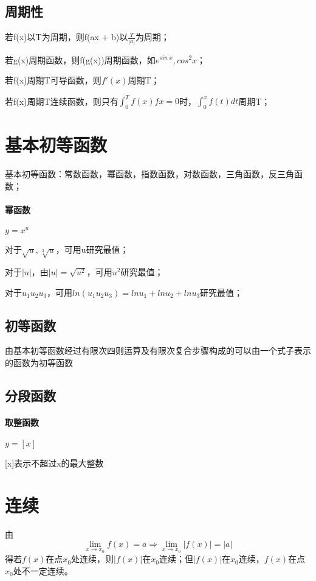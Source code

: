 \subsection{周期性}
若f(x)以T为周期，则f(ax + b)以\(\frac{T}{|a|}\)为周期；

若g(x)周期函数，则f(g(x))周期函数，如\(e^{sin\ x}, cos^2x\)；

若f(x)周期T可导函数，则\(f'(x)\)周期T；

若f(x)周期T连续函数，则只有\(\displaystyle \int_0^Tf(x)fx = 0\)时，\(\displaystyle \int_0^xf(t)dt\)周期T；


\section{基本初等函数}
基本初等函数：常数函数，幂函数，指数函数，对数函数，三角函数，反三角函数；
\paragraph{幂函数}
\(y = x^u\)

对于\(\sqrt{u},\sqrt[3]{u}\)，可用u研究最值；

对于\(|u|\)，由\(|u| = \sqrt{u^2}\)，可用\(u^2\)研究最值；

对于\(u_1u_2u_3\)，可用\(ln(u_1u_2u_3) = lnu_1 + lnu_2 + lnu_3\)研究最值；


\subsection{初等函数}
由基本初等函数经过有限次四则运算及有限次复合步骤构成的可以由一个式子表示的函数为初等函数


\subsection{分段函数}

\paragraph{取整函数}
\(y = [x]\)

[x]表示不超过x的最大整数


\section{连续}

由\[\lim_{x \to x_0}f(x) = a \Rightarrow \lim_{x \to x_0}|f(x)| = |a|\]
得若\(f(x)\)在点\(x_0\)处连续，则\(|f(x)|\)在\(x_0\)连续；但\(|f(x)|\)在\(x_0\)连续，\(f(x)\)在点\(x_0\)处不一定连续。

